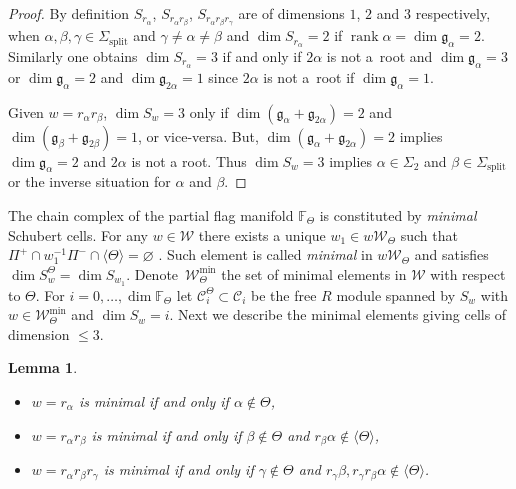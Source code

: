 \documentclass[pdftex]{sigma}
\numberwithin{equation}{section}
\newtheorem{Lemma}[Theorem]{Lemma}
\newcommand{\F}{\mathbb F}
\begin{document}
\begin{proof}By definition $S_{r_{\alpha }}$, $S_{r_{\alpha }r_{\beta }}$, $S_{r_{\alpha}r_{\beta }r_{\gamma }}$ are of dimensions $1$, $2$ and $3$ respectively, when $\alpha,\beta,\gamma \in \Sigma _{\mathrm{split}}$ and $\gamma \neq \alpha \neq \beta $ and $\dim S_{r_{\alpha }}=2$ if $\operatorname{rank}\alpha=\dim \mathfrak{g}_{\alpha }=2$. Similarly one obtains $\dim S_{r_{\alpha}}=3$ if and only if $2\alpha $ is not a~root and $\dim \mathfrak{g}_{\alpha}=3$ or $\dim \mathfrak{g}_{\alpha }=2$ and $\dim \mathfrak{g}_{2\alpha }=1$ since $2\alpha $ is not a~root if $\dim \mathfrak{g}_{\alpha }=1$.

Given $w=r_{\alpha }r_{\beta }$, $\dim S_{w}=3$ only if $\dim (\mathfrak{g}_{\alpha }+\mathfrak{g}_{2\alpha })=2$ and $\dim (\mathfrak{g}_{\beta }+\mathfrak{g}_{2\beta })=1$, or vice-versa. But, $\dim (\mathfrak{g}_{\alpha}+\mathfrak{g}_{2\alpha })=2$ implies $\dim \mathfrak{g}_{\alpha }=2$ and $2\alpha $ is not a root. Thus $\dim S_{w}=3$ implies $\alpha \in \Sigma _{2}$ and $\beta \in \Sigma _{\mathrm{split}}$ or the inverse situation for $%
\alpha $ and $\beta $.
\end{proof}

The chain complex of the partial flag manifold $\F_\Theta$ is constituted by {\em minimal} Schubert cells. For any $w\in \mathcal{W}$ there exists a unique $w_{1}\in w\mathcal{W}_{\Theta }$ such that $\Pi ^{+}\cap w_{1}^{-1}\Pi ^{-}\cap \langle\Theta\rangle =\varnothing$ \cite[Lemma~3.1]{RSM}. Such element is called {\em minimal} in $w\mathcal{W}_{\Theta }$ and satisfies $\dim S_{w}^{\Theta}=\dim S_{w_{1}}$. Deno\-te~$\mathcal{W}_{\Theta }^{\min }$ the set of minimal elements in $\mathcal{W}$ with respect to $\Theta $. For $i=0,\ldots,\dim \mathbb{F}_{\Theta }$ let $\mathcal{C}_{i}^{\Theta }\subset \mathcal{C}_{i}$ be the free $R$ module spanned by $S_{w}$ with $w\in \mathcal{W}_{\Theta}^{\min }$ and $\dim S_{w}=i$. Next we describe the minimal elements giving cells of dimension $\leq 3$.

\begin{Lemma}\label{lm.minimalroots}\quad
\begin{itemize}\itemsep=0pt
\item $w=r_\alpha$ is minimal if and only if $\alpha\notin \Theta$,
\item $w=r_{\alpha }r_{\beta }$ is minimal if and only if $\beta \notin \Theta $ and $r_{\beta }\alpha \notin \langle\Theta\rangle $,
\item $w=r_{\alpha }r_{\beta }r_{\gamma }$ is minimal if and only if $\gamma \notin \Theta $ and $r_{\gamma }\beta,r_{\gamma }r_{\beta }\alpha \notin \langle\Theta\rangle $.
\end{itemize}
\end{Lemma}
\end{document}
